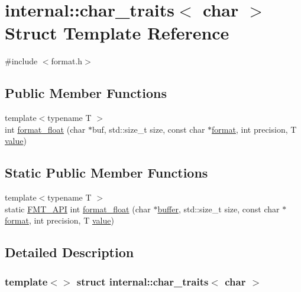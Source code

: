 \hypertarget{structinternal_1_1char__traits_3_01char_01_4}{}\section{internal\+:\+:char\+\_\+traits$<$ char $>$ Struct Template Reference}
\label{structinternal_1_1char__traits_3_01char_01_4}


{\ttfamily \#include $<$format.\+h$>$}

\subsection*{Public Member Functions}
\begin{DoxyCompactItemize}
\item 
{\footnotesize template$<$typename T $>$ }\\int \hyperlink{structinternal_1_1char__traits_3_01char_01_4_a3adc9f35e07cf3229ec84667deff9468}{format\+\_\+float} (char $\ast$buf, std\+::size\+\_\+t size, const char $\ast$\hyperlink{locale_8h_a4d9ddd9260f49d99308d41580d169bd2}{format}, int precision, T \hyperlink{classinternal_1_1value}{value})
\end{DoxyCompactItemize}
\subsection*{Static Public Member Functions}
\begin{DoxyCompactItemize}
\item 
{\footnotesize template$<$typename T $>$ }\\static \hyperlink{core_8h_a9a4960b70582ed2620911a0b75dce0b5}{F\+M\+T\+\_\+\+A\+PI} int \hyperlink{structinternal_1_1char__traits_3_01char_01_4_a7b49a14ec4a5436c27fed8e6adec0652}{format\+\_\+float} (char $\ast$\hyperlink{namespaceinternal_a5fcdbc3efad1f390e6c3f0fdafa56122}{buffer}, std\+::size\+\_\+t size, const char $\ast$\hyperlink{locale_8h_a4d9ddd9260f49d99308d41580d169bd2}{format}, int precision, T \hyperlink{classinternal_1_1value}{value})
\end{DoxyCompactItemize}


\subsection{Detailed Description}
\subsubsection*{template$<$$>$\newline
struct internal\+::char\+\_\+traits$<$ char $>$}



